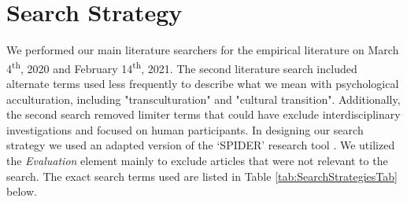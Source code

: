 \documentclass[man, 12pt, a4paper]{apa7}
\begin{document}
\printbibliography

\appendix

\section{Search Strategy}
\label{app:AppendixSearchStrategy}

We performed our main literature searchers for the empirical literature on March 4\textsuperscript{th}, 2020 and February 14\textsuperscript{th}, 2021. The second literature search included alternate terms used less frequently to describe what we mean with psychological acculturation, including "transculturation" and "cultural transition". Additionally, the second search removed limiter terms that could have exclude interdisciplinary investigations and focused on human participants.
In designing our search strategy we used an adapted version of the `SPIDER' research tool \citep[e.g.,][]{Cooke2012}. We utilized the \textit{Evaluation} element mainly to exclude articles that were not relevant to the search. The exact search terms used are listed in Table \ref{tab:SearchStrategiesTab} below.


\end{document}
